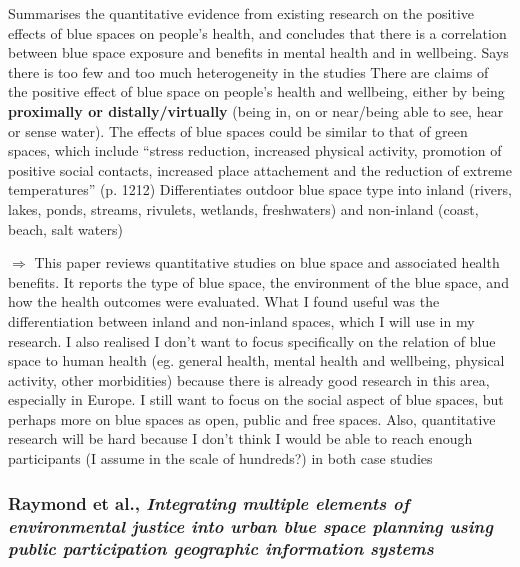 \documentclass{article}
\begin{document}
\begin{outline}
	\1 Summarises the quantitative evidence from existing research on the positive effects of blue spaces on people's health, and concludes that there is a correlation between blue space exposure and benefits in mental health and in wellbeing. Says there is too few and too much heterogeneity in the studies
	\1 There are claims of the positive effect of blue space on people's health and wellbeing, either by being \textbf{proximally or distally/virtually} (being in, on or near/being able to see, hear or sense water). The effects of blue spaces could be similar to that of green spaces, which include ``stress reduction, increased physical activity, promotion of positive social contacts, increased place attachement and the reduction of extreme temperatures'' (p. 1212)
	\1 Differentiates outdoor blue space type into inland (rivers, lakes, ponds, streams, rivulets, wetlands, freshwaters) and non-inland (coast, beach, salt waters)
	
	\1 $\Rightarrow$ This paper reviews quantitative studies on blue space and associated health benefits. It reports the type of blue space, the environment of the blue space, and how the health outcomes were evaluated.
	What I found useful was the differentiation between inland and non-inland spaces, which I will use in my research. I also realised I don't want to focus specifically on the relation of blue space to human health (eg. general health, mental health and wellbeing, physical activity, other morbidities) because there is already good research in this area, especially in Europe. I still want to focus on the social aspect of blue spaces, but perhaps more on blue spaces as open, public and free spaces. Also, quantitative research will be hard because I don't think I would be able to reach enough participants (I assume in the scale of hundreds?) in both case studies
\end{outline}

\subsubsection{Raymond et al., \textit{Integrating multiple elements of environmental justice into urban blue space planning using public participation geographic information systems}} \parencite{raymond2016integrating}
\end{document}

